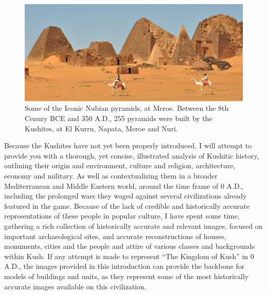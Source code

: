 \documentclass[a4paper,12pt]{scrreprt}
\begin{document}
\begin{figure}[H]
	\centering
	\includegraphics[width=\textwidth]{img/meroe_pyramids}
	\caption{Some of the Iconic Nubian pyramids, at Meroe. Between the 8th Cenury BCE and 350 A.D., 255 pyramids were built by the Kushites, at El Kurru, Napata, Meroe and Nuri.}
\end{figure}

Because the Kushites have not yet been properly introduced, I will attempt to provide you with a thorough, yet concise, illustrated analysis of Kushitic history, outlining their origin and environment, culture and religion, architecture, economy and military. As well as contextualizing them in a broader Mediterranean and Middle Eastern world, around the time frame of 0 A.D., including the prolonged wars they waged against several civilizations already featured in the game. Because of the lack of credible and historically accurate representations of these people in popular culture, I have spent some time, gathering a rich collection of historically accurate and relevant images, focused on important archaeological sites, and accurate reconstructions of houses, monuments, cities and the people and attire of various classes and backgrounds within Kush. If any attempt is made to represent “The Kingdom of Kush” in 0 A.D., the images provided in this introduction can provide the backbone for models of buildings and units, as they represent some of the most historically accurate images available on this civilization.
\end{document}
